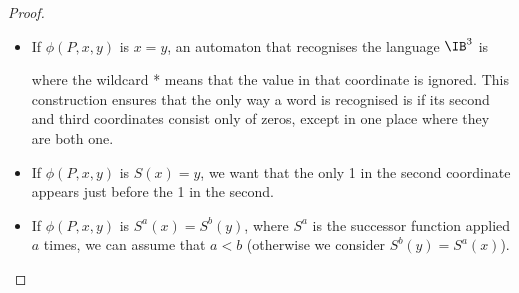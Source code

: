\begin{proof}
    \begin{itemize}
        \item If $\phi(P, x, y)$ is $x = y$, an automaton
            that recognises the language $\IB^3$ is
            \begin{center}
            \end{center}
            where the wildcard * means that the value in that coordinate
            is ignored.
            This construction ensures that the only way a word is recognised
            is if its second and third coordinates consist only of zeros,
            except in one place where they are both one.
        \item If $\phi(P, x, y)$ is $S(x) = y$, we want that the only 1
            in the second coordinate appears just before
            the 1 in the second.
        \item If $\phi(P, x, y)$ is $S^a(x) = S^b(y)$,
            where $S^a$ is the successor function applied $a$ times,
            we can assume that $a < b$ (otherwise we consider $S^b(y) = S^a(x)$).

    \end{itemize}

\end{proof}




























